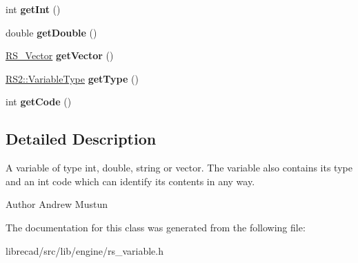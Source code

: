 \begin{DoxyCompactItemize}
\item 
\hypertarget{classRS__Variable_a8bcad9a7a8fa2084d33b75f4d7a04b35}{int {\bfseries get\-Int} ()}\label{classRS__Variable_a8bcad9a7a8fa2084d33b75f4d7a04b35}

\item 
\hypertarget{classRS__Variable_a70fe2d3ad887dc5c6b4628c291d9f96f}{double {\bfseries get\-Double} ()}\label{classRS__Variable_a70fe2d3ad887dc5c6b4628c291d9f96f}

\item 
\hypertarget{classRS__Variable_a35732514887c63f64522fc807df693d4}{\hyperlink{classRS__Vector}{R\-S\-\_\-\-Vector} {\bfseries get\-Vector} ()}\label{classRS__Variable_a35732514887c63f64522fc807df693d4}

\item 
\hypertarget{classRS__Variable_a5a3cd36697cf113b6f924a6d2a6f4b45}{\hyperlink{classRS2_af1c96c2254f823f3836e8839482870d7}{R\-S2\-::\-Variable\-Type} {\bfseries get\-Type} ()}\label{classRS__Variable_a5a3cd36697cf113b6f924a6d2a6f4b45}

\item 
\hypertarget{classRS__Variable_af597a778510d578d93f49200153ed135}{int {\bfseries get\-Code} ()}\label{classRS__Variable_af597a778510d578d93f49200153ed135}

\end{DoxyCompactItemize}


\subsection{Detailed Description}
A variable of type int, double, string or vector. The variable also contains its type and an int code which can identify its contents in any way.

\begin{DoxyAuthor}{Author}
Andrew Mustun 
\end{DoxyAuthor}


The documentation for this class was generated from the following file\-:\begin{DoxyCompactItemize}
\item 
librecad/src/lib/engine/rs\-\_\-variable.\-h\end{DoxyCompactItemize}

